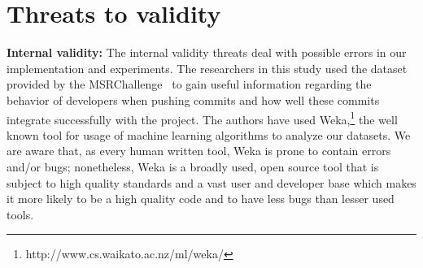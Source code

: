 \documentclass[10pt, conference]{IEEEtran}
\begin{document}
%




\section{Threats to validity}


\noindent\textbf{Internal validity:}
The internal validity threats deal with possible errors in our implementation 
and experiments.
The researchers in this study used the dataset provided by the 
MSRChallenge~\cite{msr17challenge} to gain useful information regarding the 
behavior of developers when pushing commits and how well these commits integrate 
successfully with the project. The authors have used 
Weka,\footnote{http://www.cs.waikato.ac.nz/ml/weka/} the well known tool for 
usage of machine learning algorithms to analyze our datasets. We are aware that, 
as every human written tool, Weka is prone to contain errors and/or bugs; 
nonetheless, Weka is a broadly used, open source tool that is subject to high 
quality standards and a vast user and developer base which makes it more likely 
to be a high quality code and to have less bugs than lesser used tools.
\end{document}
